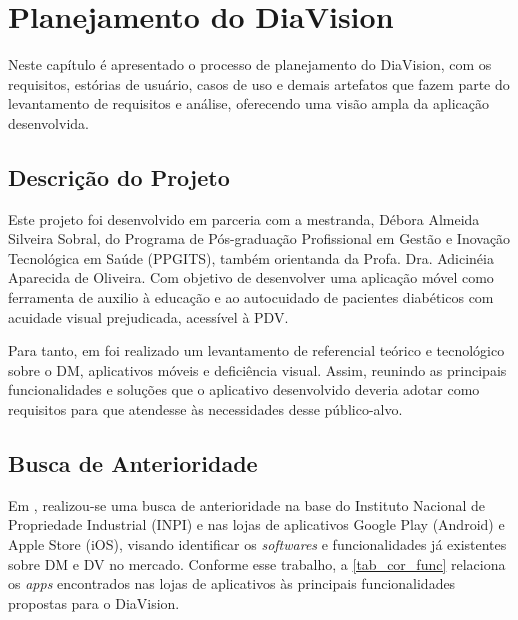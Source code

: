 \chapter{Planejamento do DiaVision}
\label{ch:plannig}

Neste capítulo é apresentado o processo de planejamento do DiaVision, com os requisitos, estórias de usuário, casos de uso
e demais artefatos que fazem parte do levantamento de requisitos e análise, oferecendo uma visão ampla da aplicação desenvolvida.

\section{Descrição do Projeto}

Este projeto foi desenvolvido em parceria com a mestranda, Débora Almeida Silveira Sobral, do
Programa de Pós-graduação Profissional em Gestão e Inovação Tecnológica em Saúde (PPGITS), também orientanda da Profa.
Dra. Adicinéia Aparecida de Oliveira. Com objetivo de desenvolver uma aplicação móvel como ferramenta de auxilio à educação
e ao autocuidado de pacientes diabéticos com acuidade visual prejudicada, acessível à PDV\@.

Para tanto, em  foi realizado um levantamento de referencial teórico e tecnológico sobre o DM,
aplicativos móveis e deficiência visual. Assim, reunindo as principais funcionalidades e soluções que o aplicativo
desenvolvido deveria adotar como requisitos para que atendesse às necessidades desse público-alvo.

\section{Busca de Anterioridade}

Em , realizou-se uma busca de anterioridade na base do Instituto Nacional de Propriedade Industrial (INPI)
e nas lojas de aplicativos Google Play (Android) e Apple Store (iOS), visando identificar os \emph{softwares} e funcionalidades
já existentes sobre DM e DV no mercado.
Conforme esse trabalho, a \autoref{tab_cor_func} relaciona os \emph{apps} encontrados
nas lojas de aplicativos às principais funcionalidades propostas para o DiaVision.

